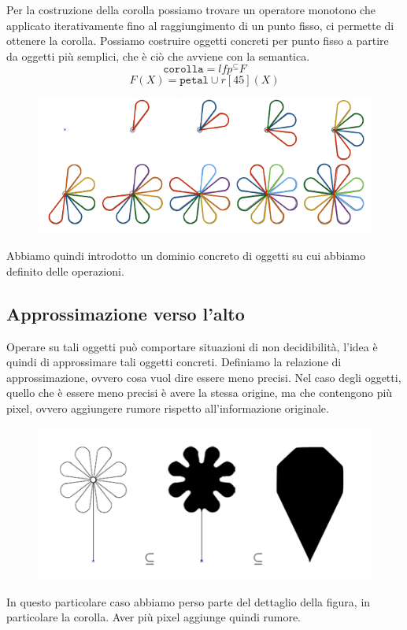 Per la costruzione della corolla possiamo trovare un operatore monotono che applicato iterativamente 
fino al raggiungimento di un punto fisso, ci permette di ottenere la corolla. Possiamo costruire oggetti 
concreti per punto fisso a partire da oggetti più semplici, che è ciò che avviene con la semantica.
\[
  \texttt{corolla} = lfp^{\subseteq} F  
\]
\[
    F(X) = \texttt{petal} \cup r[45](X)
\]
\begin{figure}[H]
    \centering
    \includegraphics[scale=0.5]{img/fixpointcorolla.png}
\end{figure}
Abbiamo quindi introdotto un dominio concreto di oggetti su cui abbiamo definito delle operazioni.
\subsection{Approssimazione verso l'alto}
Operare su tali oggetti può comportare situazioni di non decidibilità, l'idea è quindi di approssimare 
tali oggetti concreti.
Definiamo la relazione di approssimazione, ovvero cosa vuol dire essere meno precisi. Nel caso degli 
oggetti, quello che è essere meno precisi è avere la stessa origine, ma che contengono più pixel, ovvero 
aggiungere rumore rispetto all'informazione originale.
\begin{figure}[H]
    \centering
    \includegraphics[scale=0.5]{img/upperapprox.png}
\end{figure}
In questo particolare caso abbiamo perso parte del dettaglio della figura, in particolare la corolla.
Aver più pixel aggiunge quindi rumore.

